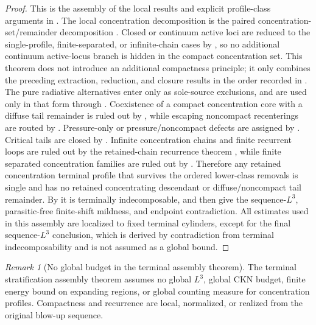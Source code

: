 \documentclass[11pt]{amsart}
\numberwithin{equation}{section}
\theoremstyle{plain}
\theoremstyle{definition}
\theoremstyle{remark}
\newtheorem{remark}[remark]{Remark}
\begin{document}
\begin{proof}
This is the assembly of the local results and explicit profile-class arguments in
.  The local
concentration decomposition is the paired concentration-set/remainder decomposition
.  Closed or continuum active loci are reduced
to the single-profile, finite-separated, or infinite-chain cases by
, so no additional continuum
active-locus branch is hidden in the compact concentration set.  This theorem does not introduce an
additional compactness principle; it only combines the preceding extraction,
reduction, and closure results in the order recorded in
.  The pure radiative alternatives enter
only as sole-source exclusions, and are used only in that form through
.  Coexistence of a compact concentration core
with a diffuse tail remainder is ruled out by
, while escaping noncompact recenterings are
routed by .  Pressure-only or
pressure/noncompact defects are assigned by
.  Critical tails are closed by
.  Infinite concentration chains and finite
recurrent loops are ruled out by the retained-chain recurrence theorem
, while finite separated concentration families are ruled out by
.  Therefore any retained
concentration terminal profile that survives the ordered lower-class removals is
single and has no retained concentrating descendant or diffuse/noncompact tail
remainder.  By  it is terminally
indecomposable, and then
give the sequence-\(L^3\), parasitic-free finite-shift mildness, and endpoint
contradiction.  All estimates used in this assembly are localized to fixed
terminal cylinders, except for the final sequence-\(L^3\) conclusion, which is
derived by contradiction from terminal indecomposability and is not assumed as a
global bound.
\end{proof}

\begin{remark}[No global budget in the terminal assembly theorem]
\label{rem:no-global-budget-terminal-theorem}
The terminal stratification assembly theorem assumes no global \(L^3\), global CKN
budget, finite energy bound on expanding regions, or global counting measure
for concentration profiles.  Compactness and recurrence are local, normalized, or
realized from the original blow-up sequence.
\end{remark}
\end{document}
